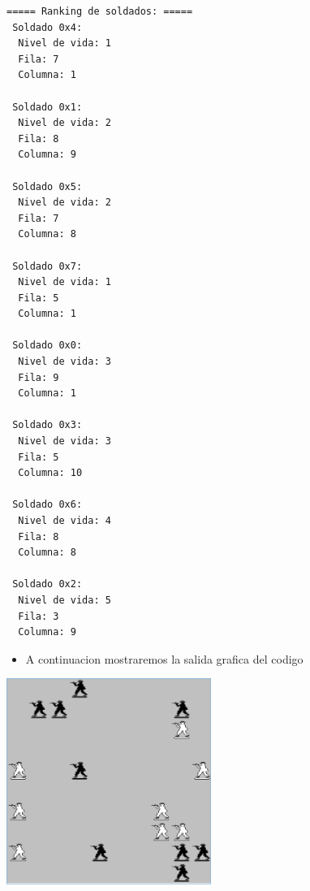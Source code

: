 \begin{lstlisting}[language=bash, caption={Ejecucion del codigo por consola}]
===== Ranking de soldados: =====
 Soldado 0x4:
  Nivel de vida: 1
  Fila: 7
  Columna: 1

 Soldado 0x1:
  Nivel de vida: 2
  Fila: 8
  Columna: 9

 Soldado 0x5:
  Nivel de vida: 2
  Fila: 7
  Columna: 8

 Soldado 0x7:
  Nivel de vida: 1
  Fila: 5
  Columna: 1

 Soldado 0x0:
  Nivel de vida: 3
  Fila: 9
  Columna: 1

 Soldado 0x3:
  Nivel de vida: 3
  Fila: 5
  Columna: 10

 Soldado 0x6:
  Nivel de vida: 4
  Fila: 8
  Columna: 8

 Soldado 0x2:
  Nivel de vida: 5
  Fila: 3
  Columna: 9
\end{lstlisting}

\begin{itemize}
  \item A continuacion mostraremos la salida grafica del codigo
\end{itemize}
\includegraphics[width=0.5\textwidth] {img/salida.jpg}
